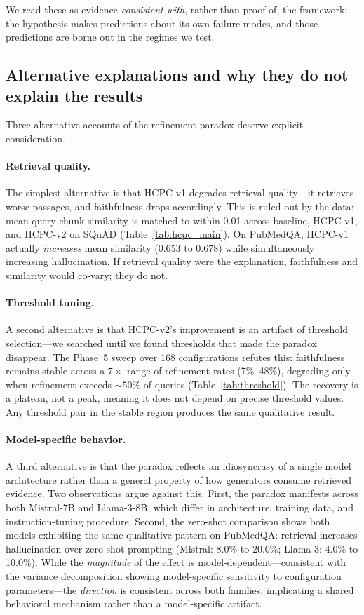 We read these as evidence \emph{consistent with}, rather than proof of,
the framework: the hypothesis makes predictions about its own failure
modes, and those predictions are borne out in the regimes we test.

\subsection{Alternative explanations and why they do not explain the results}
\label{sec:alternatives}

Three alternative accounts of the refinement paradox deserve explicit
consideration.

\paragraph{Retrieval quality.}
The simplest alternative is that HCPC-v1 degrades retrieval quality---it
retrieves worse passages, and faithfulness drops accordingly. This is
ruled out by the data: mean query-chunk similarity is matched to within
0.01 across baseline, HCPC-v1, and HCPC-v2 on SQuAD
(Table~\ref{tab:hcpc_main}). On PubMedQA, HCPC-v1 actually
\emph{increases} mean similarity (0.653 to 0.678) while simultaneously
increasing hallucination. If retrieval quality were the explanation,
faithfulness and similarity would co-vary; they do not.

\paragraph{Threshold tuning.}
A second alternative is that HCPC-v2's improvement is an artifact of
threshold selection---we searched until we found thresholds that made the
paradox disappear. The Phase~5 sweep over 168 configurations refutes
this: faithfulness remains stable across a $7\times$ range of refinement
rates (7\%--48\%), degrading only when refinement exceeds ${\sim}50\%$
of queries (Table~\ref{tab:threshold}). The recovery is a plateau, not a
peak, meaning it does not depend on precise threshold values. Any
threshold pair in the stable region produces the same qualitative
result.

\paragraph{Model-specific behavior.}
A third alternative is that the paradox reflects an idiosyncrasy of a
single model architecture rather than a general property of how
generators consume retrieved evidence. Two observations argue against
this. First, the paradox manifests across both Mistral-7B and
Llama-3-8B, which differ in architecture, training data, and
instruction-tuning procedure. Second, the zero-shot comparison shows
both models exhibiting the same qualitative pattern on PubMedQA:
retrieval increases hallucination over zero-shot prompting (Mistral:
8.0\% to 20.0\%; Llama-3: 4.0\% to 10.0\%). While the \emph{magnitude}
of the effect is model-dependent---consistent with the variance
decomposition showing model-specific sensitivity to configuration
parameters---the \emph{direction} is consistent across both families,
implicating a shared behavioral mechanism rather than a model-specific
artifact.
